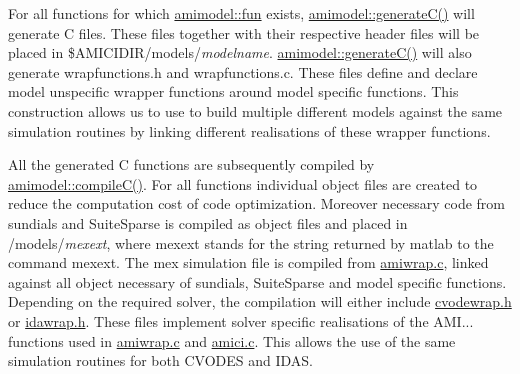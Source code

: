 For all functions for which \hyperlink{classamimodel_a743fa290dbc0a67a3843d5ab0426e9b4}{amimodel\+::fun} exists, \hyperlink{classamimodel_a73df9b3d523823e7a0105916471f13f5}{amimodel\+::generate\+C()} will generate C files. These files together with their respective header files will be placed in \$\+A\+M\+I\+C\+I\+D\+I\+R/models/{\itshape modelname}. \hyperlink{classamimodel_a73df9b3d523823e7a0105916471f13f5}{amimodel\+::generate\+C()} will also generate wrapfunctions.\+h and wrapfunctions.\+c. These files define and declare model unspecific wrapper functions around model specific functions. This construction allows us to use to build multiple different models against the same simulation routines by linking different realisations of these wrapper functions.

All the generated C functions are subsequently compiled by \hyperlink{classamimodel_abf720a0c3104977029538e3b19d429bb}{amimodel\+::compile\+C()}. For all functions individual object files are created to reduce the computation cost of code optimization. Moreover necessary code from sundials and Suite\+Sparse is compiled as object files and placed in /models/{\itshape mexext}, where mexext stands for the string returned by matlab to the command mexext. The mex simulation file is compiled from \hyperlink{amiwrap_8c}{amiwrap.\+c}, linked against all object necessary of sundials, Suite\+Sparse and model specific functions. Depending on the required solver, the compilation will either include \hyperlink{cvodewrap_8h_source}{cvodewrap.\+h} or \hyperlink{idawrap_8h_source}{idawrap.\+h}. These files implement solver specific realisations of the A\+M\+I... functions used in \hyperlink{amiwrap_8c}{amiwrap.\+c} and \hyperlink{amici_8c}{amici.\+c}. This allows the use of the same simulation routines for both C\+V\+O\+D\+E\+S and I\+D\+A\+S. 